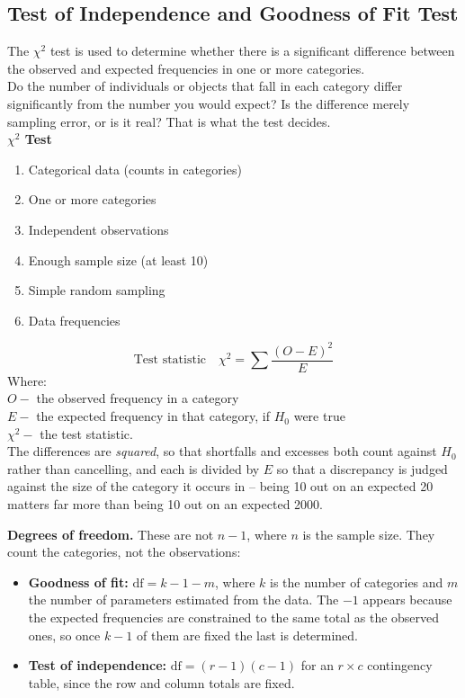 \documentclass[11pt,a4paper]{article}
\theoremstyle{definition}
\begin{document}
\subsection{Test of Independence and Goodness of Fit Test}
The $\chi^2$ test is used to determine whether there is a significant difference between the observed and expected frequencies in one or more categories.\\[1ex]
Do the number of individuals or objects that fall in each category differ significantly from the number you would expect? Is the difference merely sampling error, or is it real? That is what the test decides.\\[1ex]
\textbf{$\chi^2$ Test}
\begin{enumerate}
\item Categorical data (counts in categories)
\item One or more categories
\item Independent observations
\item Enough sample size (at least 10)
\item Simple random sampling
\item Data frequencies\\
\end{enumerate}
\[\text{Test statistic}\quad 
\chi^2=\sum \frac{(O-E)^2}{E}\]
Where:\\[1ex]
$O-$ the observed frequency in a category\\
$E-$ the expected frequency in that category, if $H_0$ were true\\
$\chi^2-$ the test statistic.\\

The differences are \emph{squared}, so that shortfalls and excesses both count against
$H_0$ rather than cancelling, and each is divided by $E$ so that a discrepancy is judged
against the size of the category it occurs in -- being 10 out on an expected 20 matters far
more than being 10 out on an expected 2000.

\textbf{Degrees of freedom.} These are not $n-1$, where $n$ is the sample size. They count
the categories, not the observations:
\begin{itemize}
\item \textbf{Goodness of fit:} $\text{df} = k-1-m$, where $k$ is the number of categories
and $m$ the number of parameters estimated from the data. The $-1$ appears because the
expected frequencies are constrained to the same total as the observed ones, so once $k-1$
of them are fixed the last is determined.
\item \textbf{Test of independence:} $\text{df} = (r-1)(c-1)$ for an $r\times c$
contingency table, since the row and column totals are fixed.
\end{itemize}
\end{document}

